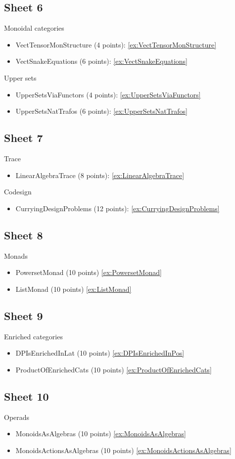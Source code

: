 \subsection{Sheet 6}

Monoidal categories
\begin{itemize}
    \item VectTensorMonStructure (4 points): \cref{ex:VectTensorMonStructure}
    \item VectSnakeEquations (6 points): \cref{ex:VectSnakeEquations}
\end{itemize}

Upper sets
\begin{itemize}
    \item UpperSetsViaFunctors (4 points): \cref{ex:UpperSetsViaFunctors}
    \item UpperSetsNatTrafos (6 points): \cref{ex:UpperSetsNatTrafos}
\end{itemize}

\subsection{Sheet 7}

Trace
\begin{itemize}
    \item LinearAlgebraTrace (8 points): \cref{ex:LinearAlgebraTrace}
\end{itemize}

Codesign
\begin{itemize}
    \item CurryingDesignProblems (12 points): \cref{ex:CurryingDesignProblems}
\end{itemize}

\subsection{Sheet 8}

Monads
\begin{itemize}
    \item PowersetMonad (10 points)  \cref{ex:PowersetMonad}
    \item ListMonad (10 points) \cref{ex:ListMonad}
\end{itemize}

\subsection{Sheet 9}

Enriched categories
\begin{itemize}
    \item DPIsEnrichedInLat (10 points)  \cref{ex:DPIsEnrichedInPos}
    \item ProductOfEnrichedCats (10 points) \cref{ex:ProductOfEnrichedCats}
\end{itemize}

\subsection{Sheet 10}

Operads
\begin{itemize}
    \item MonoidsAsAlgebras (10 points)  \cref{ex:MonoidsAsAlgebras}
    \item MonoidsActionsAsAlgebras (10 points) \cref{ex:MonoidsActionsAsAlgebras}
\end{itemize}

